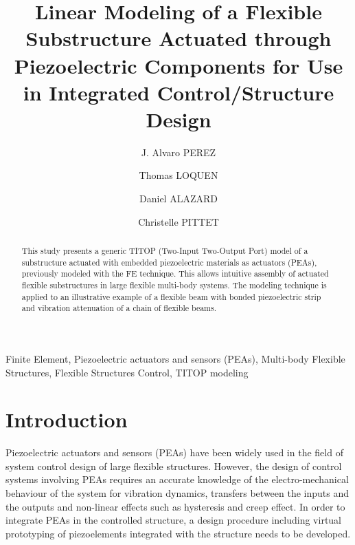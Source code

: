 \documentclass{ifacconf}
\begin{document}
\begin{frontmatter}

\title{Linear Modeling of a Flexible Substructure Actuated through Piezoelectric Components for Use in Integrated Control/Structure Design} 




\author[First]{J. Alvaro PEREZ} 
\author[Second]{Thomas LOQUEN} 
\author[Third]{Daniel ALAZARD} 
\author[Fourth]{Christelle PITTET} 


\address[First]{ONERA System Control and Flight Mechanics Department, 
   Toulouse, 31000 France (e-mail: Jose-Alvaro.Perez\_ Gonzalez@onera.fr}
   \address[Second]{ONERA System Control and Flight Mechanics Department, 
   Toulouse, 31000 France (e-mail: thomas.loquen@onera.fr}
   \address[Third]{ISAE System Control Department, 
   Toulouse, 31000 France (e-mail: daniel.alazard@isae.fr}
      \address[Fourth]{CNES AOCS Department, 
   Toulouse, 31000 France (e-mail: christelle.pittet@cnes.fr}

\begin{abstract}                \quad This study presents a generic TITOP (Two-Input Two-Output Port) model of a substructure actuated with embedded piezoelectric materials as actuators (PEAs), previously modeled with the FE technique. This allows intuitive assembly of actuated flexible substructures in large flexible multi-body systems. The modeling technique is applied to an illustrative example of a flexible beam with bonded piezoelectric strip and vibration attenuation of a chain of flexible beams.
\end{abstract}

\begin{keyword}
Finite Element, Piezoelectric actuators and sensors (PEAs), Multi-body Flexible Structures, Flexible Structures Control, TITOP modeling
\end{keyword}

\end{frontmatter}


\section{Introduction}

Piezoelectric actuators and sensors (PEAs) have been widely used in the field of system control design of large flexible structures. However, the design of control systems involving PEAs requires an accurate knowledge of the electro-mechanical behaviour of the system for vibration dynamics, transfers between the inputs and the outputs and non-linear effects such as hysteresis and creep effect. In order to integrate PEAs in the controlled structure, a design procedure including virtual prototyping of piezoelements integrated with the structure needs to be developed. 
\end{document}
